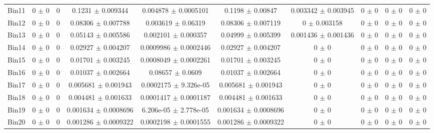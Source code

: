\begin{tabular}{@{\extracolsep{4pt}}lccccccccc@{}}
     Bin11 & 0 $\pm$ 0 & 0 & 0.1231 $\pm$ 0.009344 & 0.004878 $\pm$ 0.0005101 & 0.1198 $\pm$ 0.00847 & 0.003342 $\pm$ 0.003945 & 0 $\pm$ 0 & 0 $\pm$ 0 & 0 $\pm$ 0 \\ 
     Bin12 & 0 $\pm$ 0 & 0 & 0.08306 $\pm$ 0.007788 & 0.003619 $\pm$ 0.06319 & 0.08306 $\pm$ 0.007119 & 0 $\pm$ 0.003158 & 0 $\pm$ 0 & 0 $\pm$ 0 & 0 $\pm$ 0 \\ 
     Bin13 & 0 $\pm$ 0 & 0 & 0.05143 $\pm$ 0.005586 & 0.002101 $\pm$ 0.000357 & 0.04999 $\pm$ 0.005399 & 0.001436 $\pm$ 0.001436 & 0 $\pm$ 0 & 0 $\pm$ 0 & 0 $\pm$ 0 \\ 
     Bin14 & 0 $\pm$ 0 & 0 & 0.02927 $\pm$ 0.004207 & 0.0009986 $\pm$ 0.0002446 & 0.02927 $\pm$ 0.004207 & 0 $\pm$ 0 & 0 $\pm$ 0 & 0 $\pm$ 0 & 0 $\pm$ 0 \\ 
     Bin15 & 0 $\pm$ 0 & 0 & 0.01701 $\pm$ 0.003245 & 0.0008049 $\pm$ 0.0002261 & 0.01701 $\pm$ 0.003245 & 0 $\pm$ 0 & 0 $\pm$ 0 & 0 $\pm$ 0 & 0 $\pm$ 0 \\ 
     Bin16 & 0 $\pm$ 0 & 0 & 0.01037 $\pm$ 0.002664 & 0.08657 $\pm$ 0.0609 & 0.01037 $\pm$ 0.002664 & 0 $\pm$ 0 & 0 $\pm$ 0 & 0 $\pm$ 0 & 0 $\pm$ 0 \\ 
     Bin17 & 0 $\pm$ 0 & 0 & 0.005681 $\pm$ 0.001943 & 0.0002175 $\pm$ 9.326e-05 & 0.005681 $\pm$ 0.001943 & 0 $\pm$ 0 & 0 $\pm$ 0 & 0 $\pm$ 0 & 0 $\pm$ 0 \\ 
     Bin18 & 0 $\pm$ 0 & 0 & 0.004481 $\pm$ 0.001633 & 0.0001417 $\pm$ 0.0001187 & 0.004481 $\pm$ 0.001633 & 0 $\pm$ 0 & 0 $\pm$ 0 & 0 $\pm$ 0 & 0 $\pm$ 0 \\ 
     Bin19 & 0 $\pm$ 0 & 0 & 0.001634 $\pm$ 0.0008696 & 6.206e-05 $\pm$ 2.778e-05 & 0.001634 $\pm$ 0.0008696 & 0 $\pm$ 0 & 0 $\pm$ 0 & 0 $\pm$ 0 & 0 $\pm$ 0 \\ 
     Bin20 & 0 $\pm$ 0 & 0 & 0.001286 $\pm$ 0.0009322 & 0.0002198 $\pm$ 0.0001555 & 0.001286 $\pm$ 0.0009322 & 0 $\pm$ 0 & 0 $\pm$ 0 & 0 $\pm$ 0 & 0 $\pm$ 0 \\ 
\hline\hline
  \end{tabular}
